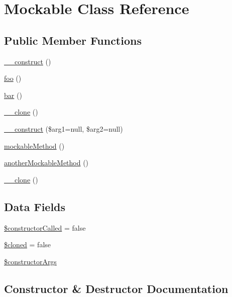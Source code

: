 \hypertarget{class_mockable}{}\section{Mockable Class Reference}
\label{class_mockable}
\subsection*{Public Member Functions}
\begin{DoxyCompactItemize}
\item 
\mbox{\hyperlink{class_mockable_a095c5d389db211932136b53f25f39685}{\+\_\+\+\_\+construct}} ()
\item 
\mbox{\hyperlink{class_mockable_a79418a120498dd9cf915655654607747}{foo}} ()
\item 
\mbox{\hyperlink{class_mockable_ad2e199af8a32cd5a9a5ba591aac8431c}{bar}} ()
\item 
\mbox{\hyperlink{class_mockable_ad0cb87b388bc74d63dc884accdca8713}{\+\_\+\+\_\+clone}} ()
\item 
\mbox{\hyperlink{class_mockable_a33d243ad30160e046b19f89e4cc6fd25}{\+\_\+\+\_\+construct}} (\$arg1=null, \$arg2=null)
\item 
\mbox{\hyperlink{class_mockable_a81ef193e0246f47187adf302f8bff813}{mockable\+Method}} ()
\item 
\mbox{\hyperlink{class_mockable_a16beb11dd7ede7590ad0bea724355ec6}{another\+Mockable\+Method}} ()
\item 
\mbox{\hyperlink{class_mockable_ad0cb87b388bc74d63dc884accdca8713}{\+\_\+\+\_\+clone}} ()
\end{DoxyCompactItemize}
\subsection*{Data Fields}
\begin{DoxyCompactItemize}
\item 
\mbox{\hyperlink{class_mockable_a26b97713c7ee0e73aea8662209e002d8}{\$constructor\+Called}} = false
\item 
\mbox{\hyperlink{class_mockable_adde823dfad7d62fbfb51f60b16dcb8d6}{\$cloned}} = false
\item 
\mbox{\hyperlink{class_mockable_a08c864d90e2a98de43ac35cf7999ff7e}{\$constructor\+Args}}
\end{DoxyCompactItemize}


\subsection{Constructor \& Destructor Documentation}
\mbox{\label{class_mockable_a095c5d389db211932136b53f25f39685}} 

